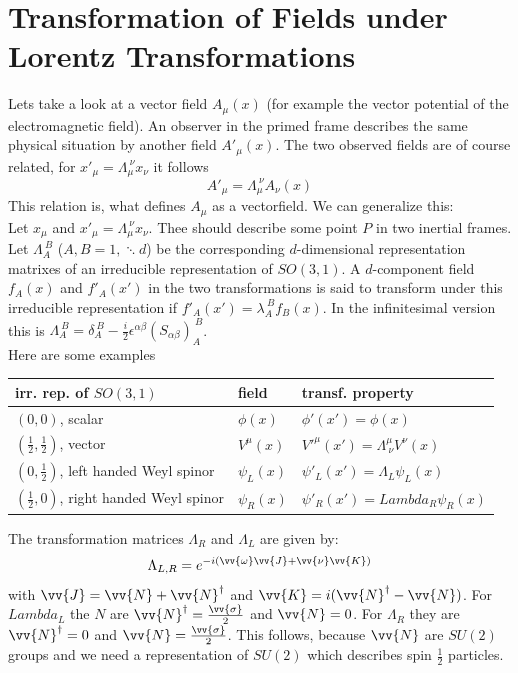 \documentclass{include/thesisclass}
\newcommand{\eps}{\epsilon}
\begin{document}
\section{Transformation of Fields under Lorentz Transformations}
Lets take a look at a vector field $A_\mu(x)$ (for example the vector potential of the electromagnetic field). An observer in the primed frame describes the same physical situation by another field $A'_\mu(x)$. The two observed fields are of course related, for $x'_\mu = \Lambda_\mu^{~\nu}x_\nu$ it follows
\[A'_\mu = \Lambda_\mu^{~\nu}A_\nu(x)\]
This relation is, what defines $A_\mu$ as a vectorfield. We can generalize this:\\
Let $x_\mu$ and $x'_\mu = \Lambda_\mu^{~\nu} x_\nu$. Thee should describe some point $P$ in two inertial frames. Let $\Lambda_A^{~B}$ ($A,B = 1, \ddots d$) be the corresponding $d$-dimensional representation matrixes of an irreducible representation of $SO(3,1)$. A $d$-component field $f_A(x)$ and $f'_A(x')$ in the two transformations is said to transform under this irreducible representation if $f'_A(x') = \lambda_A^{~B} f_B(x)$. In the infinitesimal version this is $\Lambda_A^{~B} = \delta_A^{~B} - \frac{i}{2} \eps^{\alpha \beta}(S_{\alpha\beta})_A^{~B}$.\\
Here are some examples
\begin{table}[H]
\begin{tabular}{lll}
irr. rep. of $SO(3,1)$ & field & transf. property\\
\midrule
$\left(0, 0\right)$, scalar & $\phi(x)$ & $\phi'(x') = \phi(x)$\\
$\left(\frac{1}{2}, \frac{1}{2}\right)$, vector & $V^\mu(x)$ & $V'^\mu(x') = \Lambda^\mu_{~\nu}V^\nu(x)$\\
$\left(0,\frac{1}{2}\right)$, left handed Weyl spinor & $\psi_L(x)$ & $\psi'_L(x') = \Lambda_L \psi_L(x)$\\
$\left(\frac{1}{2}, 0 \right)$, right handed Weyl spinor & $\psi_R(x)$ & $\psi'_R(x') = Lambda_R \psi_R(x)$\\
\end{tabular}
\end{table}
The transformation matrices $\Lambda_R$ and $\Lambda_L$ are given by:
\[\Lambda_{L,R} = e^{-i(\vv{\omega}\vv{J} + \vv{\nu}\vv{K})}\]
with $\vv{J} = \vv{N} + \vv{N}^\dagger$ and $\vv{K} = i (\vv{N}^\dagger - \vv{N})$. For $Lambda_L$ the $N$ are $\vv{N}^\dagger = \frac{\vv{\sigma}}{2}$ and $\vv{N} = 0$. For $\Lambda_R$ they are $\vv{N}^\dagger = 0$ and $\vv{N} = \frac{\vv{\sigma}}{2}$. This follows, because $\vv{N}$ are $SU(2)$ groups and we need a representation of $SU(2)$ which describes spin $\frac{1}{2}$ particles.\\
\end{document}
